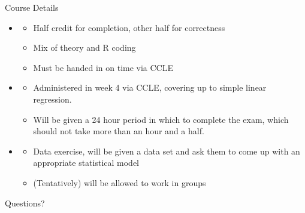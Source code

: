 \documentclass[notheorems,10pt]{beamer}
\begin{document}
\begin{frame}{Course Details} 
	\begin{itemize}
		\item<1-> 
		\begin{itemize}
			\item Half credit for completion, other half for correctness
			\item Mix of theory and R coding
			\item Must be handed in on time via CCLE
		\end{itemize}
		\item<2-> 
		\begin{itemize}
			\item Administered in week 4 via CCLE, covering up to simple linear regression.
			\item Will be given a 24 hour period in which to complete the exam, which should not take more than an hour and a half.
		\end{itemize}
		\item<3-> 
		\begin{itemize}
			\item Data exercise, will be given a data set and ask them to come up with an appropriate statistical model
			\item (Tentatively) will be allowed to work in groups
		\end{itemize}
	\end{itemize}
\end{frame}

\begin{frame}{Questions?} 
	\centering{} 
\end{frame}
\end{document}
